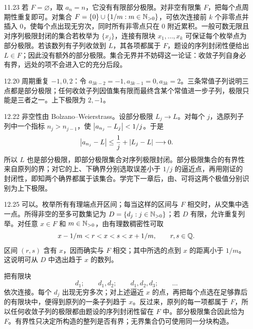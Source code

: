 \begin{solution}{11.23}
若 \(F=\varnothing\)，取 \(a_n=n\)，它没有有限部分极限。对非空有限集 \(F\)，把每个点周期性重复即可。对集合
\(F=\{0\}\cup\{1/m:m\in\mathbb{N}_{>0}\}\)，可依次连接前 \(k\) 个非零点并插入 \(0\)，使每个点出现无穷次，同时所有非零点只在 \(0\) 附近累积。一般可数无限且对序列极限封闭的集合若枚举为 \(\{x_j\}\)，连接有限块
\(x_1,\ldots,x_k\) 可保证每个枚举点为部分极限。若该数列有子列收敛到 \(L\)，其各项都属于 \(F\)，题设的序列封闭性便给出 \(L\in F\)；因此没有额外的部分极限。集合无界并不妨碍这一论证：收敛子列自身必有界，远处的项不会进入它的充分后段。
\end{solution}

\begin{solution}{12.20}
周期重复 \(-1,0,2\)：令
\(a_{3k-2}=-1,a_{3k-1}=0,a_{3k}=2\)。三条常值子列说明三点都是部分极限；任何收敛子列因值集有限而最终含某个常值进一步子列，极限只能是三者之一。上下极限为 \(2,-1\)。
\end{solution}

\begin{solution}{12.22}
非空性由 Bolzano--Weierstrass。设部分极限 \(L_j\to L\)。对每个 \(j\)，选原列子列中一个指标 \(n_j>n_{j-1}\)，使
\(\left|a_{n_j}-L_j\right|<1/j\)。于是
\[
 \left|a_{n_j}-L\right|
 \le\frac1j+\left|L_j-L\right|\longrightarrow0.
\]
所以 \(L\) 也是部分极限，即部分极限集合对序列极限封闭。部分极限集合的有界性来自原列的界；对它的上、下确界分别选取误差小于 \(1/j\) 的逼近点，再用刚证的封闭性，即知两个确界都属于该集合。学完下一章后，由、可将这两个极值分别识别为上下极限。
\end{solution}

\begin{solution}{12.25}
可以。枚举所有有理端点开区间；每当这样的区间与 \(F\) 相交时，从交集中选一点。所得非空的至多可数集记为
\(D=\{d_j:j\in\mathbb{N}_{>0}\}\)；若 \(D\) 有限，允许重复列举。对任意 \(x\in F\) 和 \(m\in\mathbb{N}_{>0}\)，由有理数稠密性可取
\[
 x-1/m<r<x<s<x+1/m,\qquad r,s\in\mathbb{Q}.
\]
区间 \((r,s)\) 含有 \(x\)，因而确实与 \(F\) 相交；其中所选的点到 \(x\) 的距离小于 \(1/m\)。这说明可从 \(D\) 中选出趋于 \(x\) 的数列。

把有限块
\[
 d_1;\qquad d_1,d_2;\qquad d_1,d_2,d_3;\qquad\ldots
\]
依次连接。每个 \(d_j\) 出现无穷多次；对上述逼近 \(x\) 的点，再把每个点选在足够靠后的有限块中，便得到原列的一条子列趋于 \(x\)。反过来，原列的每一项都属于 \(F\)，所以任何收敛子列的极限都由题设的序列封闭性留在 \(F\) 中。部分极限集合因此恰为 \(F\)。有界性只决定所构造的整列是否有界；无界集合仍可使用同一分块构造。
\end{solution}
